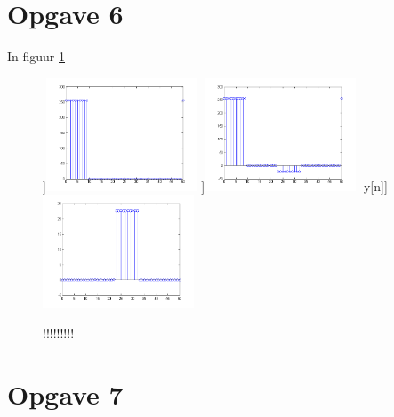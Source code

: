 \documentclass{article}
\begin{document}
\section{Opgave 6}
In figuur \ref{fig:opgave6}
\begin{figure}[h]
  \centering
 	\subfloat[][x[n]]{\includegraphics[width=0.4\textwidth]{content/6xx.png}}
	\subfloat[][y[n]]{\includegraphics[width=0.4\textwidth]{content/6yy.png}}
	\subfloat[][x[n]-y[n]]{\includegraphics[width=0.4\textwidth]{content/6.png}}
  \caption{!!!!!!!!!}
  \label{fig:opgave6}
\end{figure}

\section{Opgave 7}

\end{document}
